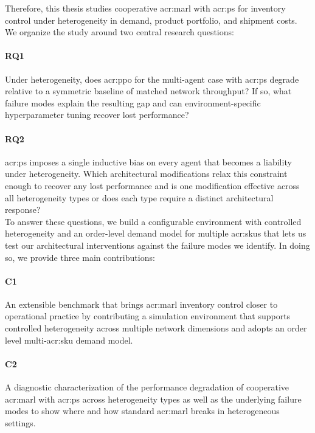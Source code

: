 Therefore, this thesis studies cooperative \gls{acr:marl} with \gls{acr:ps} for inventory control under heterogeneity in demand, product portfolio, and shipment
costs. We organize the study around two central research questions:

\paragraph{\textbf{RQ1}}
Under heterogeneity, does \gls{acr:ppo} for the multi-agent case with \gls{acr:ps} degrade relative to a symmetric baseline of matched network throughput? If so, what failure modes explain the resulting gap and can environment-specific hyperparameter tuning recover lost performance?

\vspace{-0.7\baselineskip}
\paragraph{\textbf{RQ2}}
\gls{acr:ps} imposes a single inductive bias on every agent that becomes a
liability under heterogeneity. Which architectural modifications relax this
constraint enough to recover any lost performance and is one modification effective
across all heterogeneity types or does each type require a distinct architectural
response?\\

To answer these questions, we build a configurable environment with controlled
heterogeneity and an order-level demand model for multiple \glspl{acr:sku} that lets us test our architectural interventions against the failure modes we identify. In doing so, we provide three main contributions:

\paragraph{\textbf{C1}} An extensible benchmark that brings \gls{acr:marl} inventory control closer to operational practice by contributing a simulation environment that supports controlled heterogeneity across multiple network dimensions and adopts an order level multi-\gls{acr:sku} demand model.

\vspace{-0.7\baselineskip}
\paragraph{\textbf{C2}} A diagnostic characterization of the performance degradation of cooperative \gls{acr:marl} with \gls{acr:ps} across heterogeneity types as well as the underlying failure modes to show where and how standard \gls{acr:marl} breaks in heterogeneous settings.


